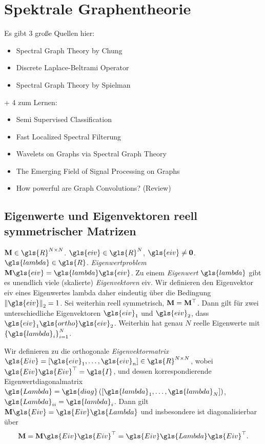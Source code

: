 \section{Spektrale Graphentheorie}
\label{spektrale_graphentheorie}

Es gibt 3 große Quellen hier:
\begin{itemize}
  \item Spectral Graph Theory by Chung
  \item Discrete Laplace-Beltrami Operator
  \item Spectral Graph Theory by Spielman
\end{itemize}
+ 4 zum Lernen:
\begin{itemize}
  \item Semi Supervised Classification
  \item Fast Localized Spectral Filterung
  \item Wavelets on Graphs via Spectral Graph Theory
  \item The Emerging Field of Signal Processing on Graphs
  \item How powerful are Graph Convolutions? (Review)
\end{itemize}

\subsection{Eigenwerte und Eigenvektoren reell symmetrischer Matrizen}
\label{eigenwerte_symmetrischer_matrizen}


$\ma{M} \in \gls{R}^{N \times N}$.
$\gls{eiv} \in \gls{R}^{N}$, $\gls{eiv} \neq \mathbf{0}$.
$\gls{lambda} \in \gls{R}$.
\emph{Eigenwertproblem} $\ma{M}\gls{eiv} = \gls{lambda}\gls{eiv}$.
Zu einem \emph{Eigenwert} $\gls{lambda}$ gibt es unendlich viele (skalierte) \emph{Eigenvektoren} \gls{eiv}.
Wir definieren den Eigenvektor \gls{eiv} eines Eigenwertes \gls{lambda} daher eindeutig über die Bedingung $\left\|\gls{eiv}\right\|_2 = 1$.
Sei  weiterhin reell symmetrisch, \dhe{} $\mathbf{M} = \mathbf{M}^{\top}$.
Dann gilt für zwei unterschiedliche Eigenvektoren $\gls{eiv}_1$ und $\gls{eiv}_2$, dass $\gls{eiv}_1 \gls{ortho} \gls{eiv}_2$.
Weiterhin hat  genau $N$ reelle Eigenwerte mit ${\left\{\gls{lambda}_i\right\}}_{i=1}^N$.

Wir definieren zu  die orthogonale \emph{Eigenvektormatrix} $\gls{Eiv} = \left[\gls{eiv}_1, \ldots, \gls{eiv}_n\right] \in \gls{R}^{N \times N}$, wobei $\gls{Eiv}\gls{Eiv}^{\top}=\gls{I}$, und dessen korrespondierende Eigenwertdiagonalmatrix $\gls{Lambda} = \gls{diag}\left(\left[\gls{lambda}_1, \ldots, \gls{lambda}_N\right]\right)$, \dhe{} $\gls{Lambda}_{ii} = \gls{lambda}_i$.
Dann gilt $\ma{M}\gls{Eiv} = \gls{Eiv}\gls{Lambda}$ und insbesondere ist  diagonalisierbar über
\begin{equation}
  \ma{M} = \ma{M}\gls{Eiv}\gls{Eiv}^{\top} = \gls{Eiv}\gls{Lambda}\gls{Eiv}^{\top}.
\end{equation}


